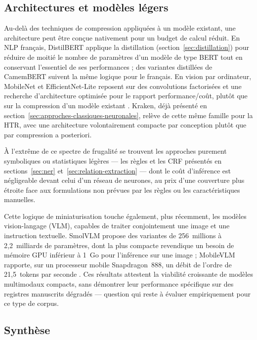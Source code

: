 \subsection{Architectures et modèles légers}
\label{sec:architectures-legeres}

Au-delà des techniques de compression appliquées à un modèle existant, une architecture peut être conçue nativement pour un budget de calcul réduit.
En NLP français, DistilBERT applique la distillation (section~\ref{sec:distillation}) pour réduire de moitié le nombre de paramètres d'un modèle de type BERT tout en conservant l'essentiel de ses performances \cite{sanh2019distilbert} ; des variantes distillées de CamemBERT suivent la même logique pour le français.
En vision par ordinateur, MobileNet \cite{howard2017mobilenets} et EfficientNet-Lite reposent sur des convolutions factorisées et une recherche d'architecture optimisée pour le rapport performance/coût, plutôt que sur la compression d'un modèle existant \cite{tan2019efficientnet}.
Kraken, déjà présenté en section~\ref{sec:approches-classiques-neuronales}, relève de cette même famille pour la HTR, avec une architecture volontairement compacte par conception plutôt que par compression a posteriori.

À l'extrême de ce spectre de frugalité se trouvent les approches purement symboliques ou statistiques légères --- les règles et les CRF présentés en sections~\ref{sec:ner} et~\ref{sec:relation-extraction} --- dont le coût d'inférence est négligeable devant celui d'un réseau de neurones, au prix d'une couverture plus étroite face aux formulations non prévues par les règles ou les caractéristiques manuelles.

Cette logique de miniaturisation touche également, plus récemment, les modèles vision-langage (VLM), capables de traiter conjointement une image et une instruction textuelle.
SmolVLM propose des variantes de 256~millions à 2,2~milliards de paramètres, dont la plus compacte revendique un besoin de mémoire GPU inférieur à 1~Go pour l'inférence sur une image \cite{marafioti2025smolvlm} ; MobileVLM rapporte, sur un processeur mobile Snapdragon~888, un débit de l'ordre de 21,5~tokens par seconde \cite{chu2023mobilevlm}.
Ces résultats attestent la viabilité croissante de modèles multimodaux compacts, sans démontrer leur performance spécifique sur des registres manuscrits dégradés --- question qui reste à évaluer empiriquement pour ce type de corpus.

\subsection{Synthèse}
\label{sec:synthese-frugalite}

